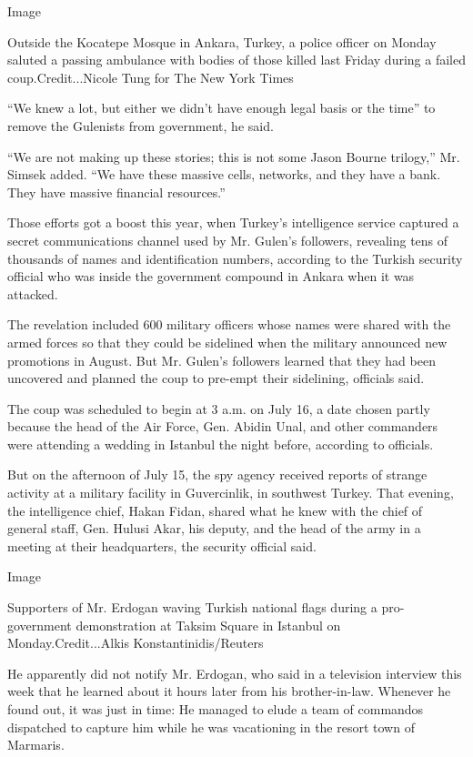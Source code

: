 Image

Outside the Kocatepe Mosque in Ankara, Turkey, a police officer on
Monday saluted a passing ambulance with bodies of those killed last
Friday during a failed coup.Credit...Nicole Tung for The New York Times

``We knew a lot, but either we didn't have enough legal basis or the
time'' to remove the Gulenists from government, he said.

``We are not making up these stories; this is not some Jason Bourne
trilogy,'' Mr. Simsek added. ``We have these massive cells, networks,
and they have a bank. They have massive financial resources.''

Those efforts got a boost this year, when Turkey's intelligence service
captured a secret communications channel used by Mr. Gulen's followers,
revealing tens of thousands of names and identification numbers,
according to the Turkish security official who was inside the government
compound in Ankara when it was attacked.

The revelation included 600 military officers whose names were shared
with the armed forces so that they could be sidelined when the military
announced new promotions in August. But Mr. Gulen's followers learned
that they had been uncovered and planned the coup to pre-empt their
sidelining, officials said.

The coup was scheduled to begin at 3 a.m. on July 16, a date chosen
partly because the head of the Air Force, Gen. Abidin Unal, and other
commanders were attending a wedding in Istanbul the night before,
according to officials.

But on the afternoon of July 15, the spy agency received reports of
strange activity at a military facility in Guvercinlik, in southwest
Turkey. That evening, the intelligence chief, Hakan Fidan, shared what
he knew with the chief of general staff, Gen. Hulusi Akar, his deputy,
and the head of the army in a meeting at their headquarters, the
security official said.

Image

Supporters of Mr. Erdogan waving Turkish national flags during a
pro-government demonstration at Taksim Square in Istanbul on
Monday.Credit...Alkis Konstantinidis/Reuters

He apparently did not notify Mr. Erdogan, who said in a television
interview this week that he learned about it hours later from his
brother-in-law. Whenever he found out, it was just in time: He managed
to elude a team of commandos dispatched to capture him while he was
vacationing in the resort town of Marmaris.


